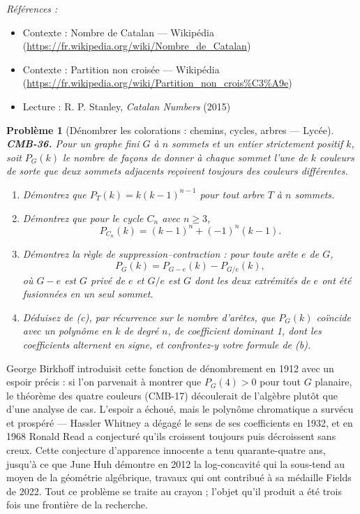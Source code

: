 \documentclass[11pt]{article}
\newtheorem{problem}{Problème}
\newenvironment{refs}{\par\small\noindent\emph{Références :}\begin{itemize}\setlength\itemsep{0pt}}{\end{itemize}\normalsize}
\begin{document}
\begin{refs}
\item Contexte : Nombre de Catalan --- Wikipédia (\url{https://fr.wikipedia.org/wiki/Nombre_de_Catalan})
\item Contexte : Partition non croisée --- Wikipédia (\url{https://fr.wikipedia.org/wiki/Partition_non_crois%C3%A9e})
\item Lecture : R. P. Stanley, \textit{Catalan Numbers} (2015)
\end{refs}

\bigskip

\begin{problem}[{Dénombrer les colorations : chemins, cycles, arbres --- Lycée}]
\textbf{CMB-36.} Pour un graphe fini $ G $ à $ n $ sommets et un entier strictement positif $ k $, soit $ P_G(k) $ le nombre de façons de donner à chaque sommet l'une de $ k $ couleurs de sorte que deux sommets adjacents reçoivent toujours des couleurs différentes.
\begin{enumerate}
\item[(a)] Démontrez que $ P_T(k) = k(k-1)^{n-1} $ pour tout arbre $ T $ à $ n $ sommets.
\item[(b)] Démontrez que pour le cycle $ C_n $ avec $ n \ge 3 $,
\[ P_{C_n}(k) = (k-1)^n + (-1)^n (k-1). \]
\item[(c)] Démontrez la règle de suppression--contraction : pour toute arête $ e $ de $ G $,
\[ P_G(k) = P_{G-e}(k) - P_{G/e}(k), \]
où $ G-e $ est $ G $ privé de $ e $ et $ G/e $ est $ G $ dont les deux extrémités de $ e $ ont été fusionnées en un seul sommet.
\item[(d)] Déduisez de (c), par récurrence sur le nombre d'arêtes, que $ P_G(k) $ coïncide avec un polynôme en $ k $ de degré $ n $, de coefficient dominant 1, dont les coefficients alternent en signe, et confrontez-y votre formule de (b).
\end{enumerate}

\end{problem}

\noindent George Birkhoff introduisit cette fonction de dénombrement en 1912 avec un espoir précis : si l'on parvenait à montrer que $ P_G(4) > 0 $ pour tout $ G $ planaire, le théorème des quatre couleurs (CMB-17) découlerait de l'algèbre plutôt que d'une analyse de cas. L'espoir a échoué, mais le polynôme chromatique a survécu et prospéré --- Hassler Whitney a dégagé le sens de ses coefficients en 1932, et en 1968 Ronald Read a conjecturé qu'ils croissent toujours puis décroissent sans creux. Cette conjecture d'apparence innocente a tenu quarante-quatre ans, jusqu'à ce que June Huh démontre en 2012 la log-concavité qui la sous-tend au moyen de la géométrie algébrique, travaux qui ont contribué à sa médaille Fields de 2022. Tout ce problème se traite au crayon ; l'objet qu'il produit a été trois fois une frontière de la recherche.
\end{document}
